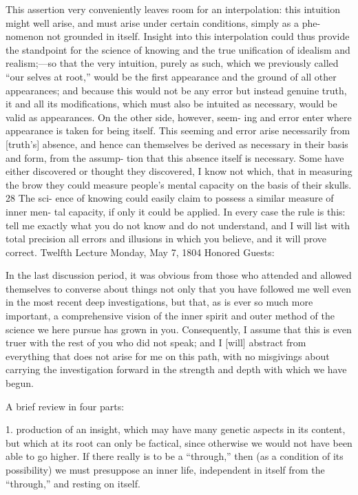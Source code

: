  This
assertion very conveniently leaves room for an interpolation: this intuition
might well arise, and must arise under certain conditions, simply as a phe-
nomenon not grounded in itself.
 Insight into this interpolation could thus
provide the standpoint for the science of knowing and the true unification of
idealism and realism;—so that the very intuition, purely as such, which we
previously called “our selves at root,” would be the first appearance and the
ground of all other appearances; and because this would not be any error but
instead genuine truth, it and all its modifications, which must also be intuited
as necessary, would be valid as appearances.
 On the other side, however, seem-
ing and error enter where appearance is taken for being itself.
 This seeming
and error arise necessarily from [truth’s] absence, and hence can
themselves be derived as necessary in their basis and form, from the assump-
tion that this absence itself is necessary.
 Some have either discovered or
thought they discovered, I know not which, that in measuring the brow they
could measure people’s mental capacity on the basis of their skulls.
 28 The sci-
ence of knowing could easily claim to possess a similar measure of inner men-
tal capacity, if only it could be applied.
 In every case the rule is this: tell me
exactly what you do not know and do not understand, and I will list with total
precision all errors and illusions in which you believe, and it will prove correct.
Twelfth Lecture
Monday, May 7, 1804
Honored Guests:

In the last discussion period, it was obvious from those who attended and
allowed themselves to converse about things not only that you have followed
me well even in the most recent deep investigations, but that, as is ever so
much more important, a comprehensive vision of the inner spirit and outer
method of the science we here pursue has grown in you.
Consequently, I
assume that this is even truer with the rest of you who did not speak; and I
[will] abstract from everything that does not arise for me on this path, with
no misgivings about carrying the investigation forward in the strength and
depth with which we have begun.

A brief review in four parts:

1. production of an insight,
which may have many genetic aspects in its content,
but which at its root can only be factical,
since otherwise we would not have been able to go higher.
If there really is to be a “through,” then
(as a condition of its possibility) we must presuppose
an inner life, independent in itself from the “through,”
and resting on itself.

